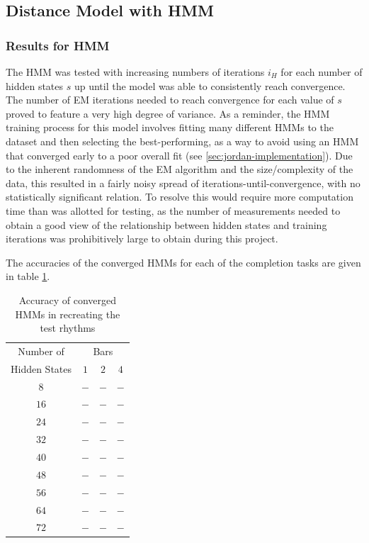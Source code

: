 \documentclass[ author={Stephen Livermore-Tozer},
				supervisor={Dr. Peter Flach},
				degree={MEng},
				title={Algorithmic Co-composition Using Machine Learning},
				subtitle={},
				type={research},
				year={2016} ]{dissertation}
\begin{document}
	\subsection{Distance Model with HMM}
	
	
	
	\subsubsection{Results for HMM}
	
	The HMM was tested with increasing numbers of iterations $i_H$ for each number of hidden states $s$ up until the model was able to consistently reach convergence. The number of EM iterations needed to reach convergence for each value of $s$ proved to feature a very high degree of variance. As a reminder, the HMM training process for this model involves fitting many different HMMs to the dataset and then selecting the best-performing, as a way to avoid using an HMM that converged early to a poor overall fit (see \ref{sec:jordan-implementation}). Due to the inherent randomness of the EM algorithm and the size/complexity of the data, this resulted in a fairly noisy spread of iterations-until-convergence, with no statistically significant relation. To resolve this would require more computation time than was allotted for testing, as the number of measurements needed to obtain a good view of the relationship between hidden states and training iterations was prohibitively large to obtain during this project.
	
	The accuracies of the converged HMMs for each of the completion tasks are given in table \ref{tab:hmm-results}. 
	
	\begin{table}[h]
		\begin{center}
			\begin{tabular}{cccc}
				\toprule
				Number of& \multicolumn{3}{c}{Bars}\\
				\cline{2-4}
				Hidden States& $1$ & $2$ & $4$\\
				\hline
				$8$ & $-$ & $-$ & $-$\\
				$16$ & $-$ & $-$ & $-$\\
				$24$ & $-$ & $-$ & $-$\\
				$32$ & $-$ & $-$ & $-$\\
				$40$ & $-$ & $-$ & $-$\\
				$48$ & $-$ & $-$ & $-$\\
				$56$ & $-$ & $-$ & $-$\\
				$64$ & $-$ & $-$ & $-$\\
				$72$ & $-$ & $-$ & $-$\\
				\bottomrule
			\end{tabular}
		\end{center}
		\caption{Accuracy of converged HMMs in recreating the test rhythms}
		\label{tab:hmm-results}
	\end{table}
	
\end{document}
